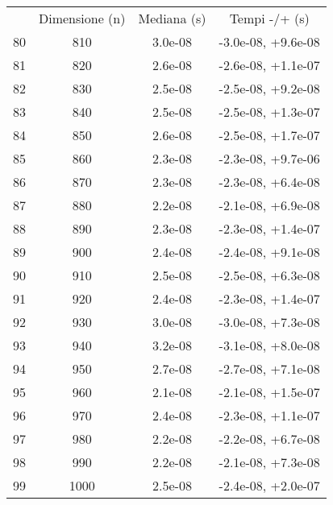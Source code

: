 \begin{table}
\centering
\begin{adjustbox}{width=1\textwidth/2}
\begin{tabular}{|c|c|c|c|}
\hline
 & Dimensione (n) & Mediana (s) & Tempi -/+ (s) \\
80 & 810 & 3.0e-08 & -3.0e-08, +9.6e-08 \\
\cline{1-4}
81 & 820 & 2.6e-08 & -2.6e-08, +1.1e-07 \\
\cline{1-4}
82 & 830 & 2.5e-08 & -2.5e-08, +9.2e-08 \\
\cline{1-4}
83 & 840 & 2.5e-08 & -2.5e-08, +1.3e-07 \\
\cline{1-4}
84 & 850 & 2.6e-08 & -2.5e-08, +1.7e-07 \\
\cline{1-4}
85 & 860 & 2.3e-08 & -2.3e-08, +9.7e-06 \\
\cline{1-4}
86 & 870 & 2.3e-08 & -2.3e-08, +6.4e-08 \\
\cline{1-4}
87 & 880 & 2.2e-08 & -2.1e-08, +6.9e-08 \\
\cline{1-4}
88 & 890 & 2.3e-08 & -2.3e-08, +1.4e-07 \\
\cline{1-4}
89 & 900 & 2.4e-08 & -2.4e-08, +9.1e-08 \\
\cline{1-4}
90 & 910 & 2.5e-08 & -2.5e-08, +6.3e-08 \\
\cline{1-4}
91 & 920 & 2.4e-08 & -2.3e-08, +1.4e-07 \\
\cline{1-4}
92 & 930 & 3.0e-08 & -3.0e-08, +7.3e-08 \\
\cline{1-4}
93 & 940 & 3.2e-08 & -3.1e-08, +8.0e-08 \\
\cline{1-4}
94 & 950 & 2.7e-08 & -2.7e-08, +7.1e-08 \\
\cline{1-4}
95 & 960 & 2.1e-08 & -2.1e-08, +1.5e-07 \\
\cline{1-4}
96 & 970 & 2.4e-08 & -2.3e-08, +1.1e-07 \\
\cline{1-4}
97 & 980 & 2.2e-08 & -2.2e-08, +6.7e-08 \\
\cline{1-4}
98 & 990 & 2.2e-08 & -2.1e-08, +7.3e-08 \\
\cline{1-4}
99 & 1000 & 2.5e-08 & -2.4e-08, +2.0e-07 \\
\cline{1-4}
\end{tabular}
\end{adjustbox}
\end{table}

